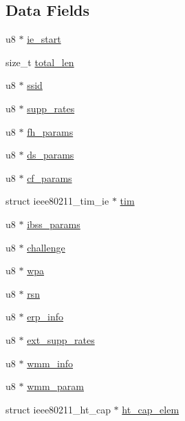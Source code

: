\subsection*{Data Fields}
\begin{DoxyCompactItemize}
\item 
u8 $\ast$ \hyperlink{structieee802__11__elems_ac67563c8768abab887c25047515b040c}{ie\-\_\-start}
\item 
size\-\_\-t \hyperlink{structieee802__11__elems_aa117fc7f9adae4a74d56508b20f7de1f}{total\-\_\-len}
\item 
u8 $\ast$ \hyperlink{structieee802__11__elems_a2b1a755b5ea91fcd084b731e52d74baa}{ssid}
\item 
u8 $\ast$ \hyperlink{structieee802__11__elems_a046b4135d5b0e0fce9a2100e81bb2cf1}{supp\-\_\-rates}
\item 
u8 $\ast$ \hyperlink{structieee802__11__elems_a1bfe816ebad00d8d582c5b957d45acb8}{fh\-\_\-params}
\item 
u8 $\ast$ \hyperlink{structieee802__11__elems_ac2f2349fb1f40ffc5e91ec3ad5fe678f}{ds\-\_\-params}
\item 
u8 $\ast$ \hyperlink{structieee802__11__elems_ae663298f76d3de3852deeaa305626d62}{cf\-\_\-params}
\item 
struct ieee80211\-\_\-tim\-\_\-ie $\ast$ \hyperlink{structieee802__11__elems_a09f63823f0fa5e1802acd5874911d07a}{tim}
\item 
u8 $\ast$ \hyperlink{structieee802__11__elems_a7fac4f71f2df266e10c20cca69544c9b}{ibss\-\_\-params}
\item 
u8 $\ast$ \hyperlink{structieee802__11__elems_abd6006bde809b197adccf583f4206332}{challenge}
\item 
u8 $\ast$ \hyperlink{structieee802__11__elems_a4f433e136c9ee02a2dc8e9484078cd60}{wpa}
\item 
u8 $\ast$ \hyperlink{structieee802__11__elems_a052b78ba85219ace0375b4ced0902a0c}{rsn}
\item 
u8 $\ast$ \hyperlink{structieee802__11__elems_a5afa785c397a503afdef4c895bf319d6}{erp\-\_\-info}
\item 
u8 $\ast$ \hyperlink{structieee802__11__elems_a59cf8f9fa556a38286cdf904fc6c8ac2}{ext\-\_\-supp\-\_\-rates}
\item 
u8 $\ast$ \hyperlink{structieee802__11__elems_a1051a8e53a01158ff3f9675d8ec9c6e5}{wmm\-\_\-info}
\item 
u8 $\ast$ \hyperlink{structieee802__11__elems_a72ab3e59dc8571dab876636d8fb484f7}{wmm\-\_\-param}
\item 
struct ieee80211\-\_\-ht\-\_\-cap $\ast$ \hyperlink{structieee802__11__elems_ac24d4796157d7ad3003b848a7ce3c118}{ht\-\_\-cap\-\_\-elem}

\end{DoxyCompactItemize}
